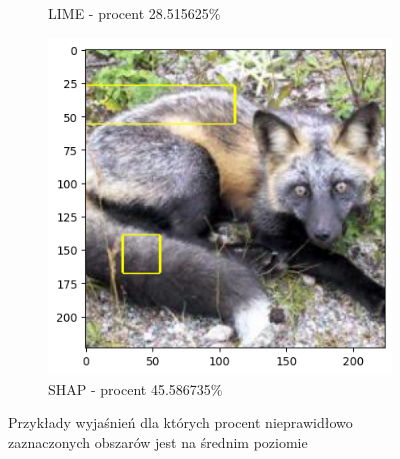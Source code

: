 \begin{figure}[h]
\begin{subfigure}[b]{0.3\textwidth}
		\caption{LIME - procent 28.515625\%}
	\end{subfigure}
	\begin{subfigure}[b]{0.3\textwidth}
		\includegraphics[width=.9\textwidth]{img/examples/appendix/n02120505_19480_shap}
		\caption{SHAP - procent 45.586735\%}
	\end{subfigure}
	\caption{Przykłady wyjaśnień dla których procent nieprawidłowo zaznaczonych obszarów jest na średnim poziomie}
	\label{}
\end{figure}

